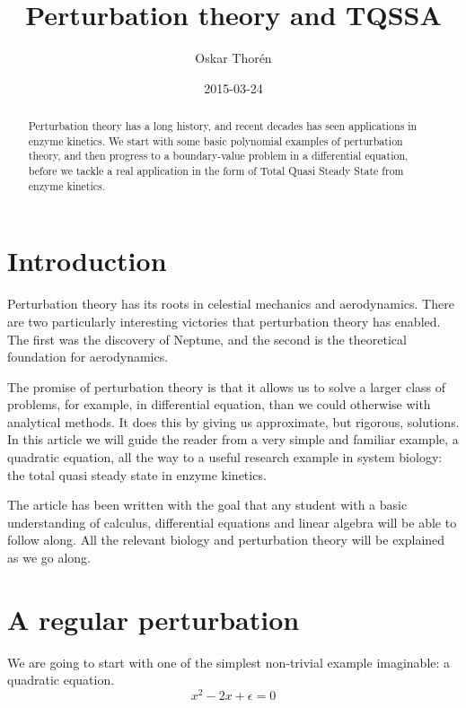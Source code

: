\documentclass[12pt]{article}
\title{Perturbation theory and TQSSA}
\author{Oskar Thor\'{e}n}
\date{2015-03-24}
\begin{document}
\nocite{*} %
\maketitle

\begin{abstract}
Perturbation theory has a long history, and recent decades has seen applications
in enzyme kinetics. We start with some basic polynomial examples of perturbation
theory, and then progress to a boundary-value problem in a differential
equation, before we tackle a real application in the form of Total Quasi Steady
State from enzyme kinetics.
\end{abstract}

\clearpage
\tableofcontents
\clearpage

\section{Introduction}

Perturbation theory has its roots in celestial mechanics and
aerodynamics. There are two particularly interesting victories that
perturbation theory has enabled. The first was the discovery of
Neptune, and the second is the theoretical foundation for
aerodynamics.

The promise of perturbation theory is that it allows us to solve a
larger class of problems, for example, in differential equation, than
we could otherwise with analytical methods. It does this by giving us
approximate, but rigorous, solutions. In this article we will guide
the reader from a very simple and familiar example, a quadratic
equation, all the way to a useful research example in system biology:
the total quasi steady state in enzyme kinetics.

The article has been written with the goal that any student with a basic
understanding of calculus, differential equations and linear algebra will be
able to follow along. All the relevant biology and perturbation theory will be
explained as we go along.

\section{A regular perturbation}

We are going to start with one of the simplest non-trivial example imaginable:
a quadratic equation.
\begin{equation}
x^2 - 2x + \epsilon = 0
\end{equation}
\end{document}
